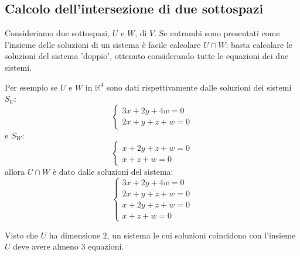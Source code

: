 
\subsection{Calcolo dell'intersezione di due sottospazi}
Consideriamo due sottospazi, $U$ e $W$, di $V$. Se entrambi sono presentati
come l'insieme delle soluzioni di un sistema \`e facile calcolare $U \cap W$:
basta calcolare le soluzioni del sistema 'doppio', ottenuto considerando tutte
le equazioni dei due sistemi.

Per esempio se $U$ e $W$ in $\mathbb{R}^4$ sono dati rispettivamente dalle
soluzioni dei sistemi $S_U$:
\begin{equation*}
	\begin{cases}
		3x + 2y + 4w = 0 \\
		2x + y + z + w = 0
	\end{cases}
\end{equation*}
e $S_W$:
\begin{equation*}
	\begin{cases}
		x + 2y + z + w = 0 \\
		x + z + w = 0
	\end{cases}
\end{equation*}
allora $U \cap W$ \`e dato dalle soluzioni del sistema:
\begin{equation*}
	\begin{cases}
		3x + 2y + 4w = 0   \\
		2x + y + z + w = 0 \\
		x + 2y + z + w = 0 \\
		x + z + w = 0
	\end{cases}
\end{equation*}

\begin{observation}
	Visto che $U$ ha dimensione 2, un sistema le cui soluzioni coincidono con
	l'insieme $U$ deve avere almeno 3 equazioni.
\end{observation}

